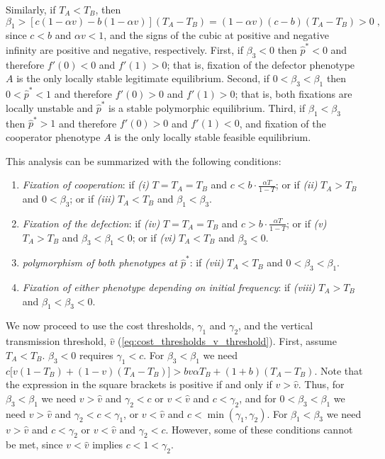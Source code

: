 \documentclass[12pt]{extarticle}
\begin{document}
\begin{appendices}
Similarly, if $T_A<T_B$, then
\begin{equation} \label{eq:beta1_rev}
   \beta_1 > [c(1-\alpha v) - b(1-\alpha v)] (T_A-T_B) 
   = (1-\alpha v)(c-b)(T_A-T_B) > 0 \;,
 \end{equation}
since $c<b$ and $\alpha v < 1$, and the signs of the cubic at positive and negative infinity are positive and negative, respectively. 
First, if $\beta_3<0$ then $\hat{p}^*<0$ and therefore $f'(0)<0$ and $f'(1)>0$; that is, fixation of the defector phenotype $A$ is the only locally stable legitimate equilibrium.
Second, if $0<\beta_3<\beta_1$ then $0<\hat{p}^*<1$ and therefore $f'(0)>0$ and $f'(1)>0$; that is, both fixations are locally unstable and $\hat{p}^*$ is a stable polymorphic equilibrium.
Third, if $\beta_1<\beta_3$ then $\hat{p}^*>1$ and therefore $f'(0)>0$ and $f'(1)<0$, and fixation of the cooperator phenotype $A$ is the only locally stable feasible equilibrium.

This analysis can be summarized with the following conditions:
\begin{enumerate}
\item \emph{Fixation of cooperation}: 
	if \emph{(i)} $T=T_A=T_B$ and $c < b\cdot \frac{\alpha T}{1-T}$; or
	if \emph{(ii)} $T_A>T_B$ and $0<\beta_3$; or 
	if \emph{(iii)} $T_A<T_B$ and $\beta_1<\beta_3$.
\item \emph{Fixation of the defection}: 
	if \emph{(iv)}  $T=T_A=T_B$ and $c > b\cdot \frac{\alpha T}{1-T}$; or 
	if \emph{(v)} $T_A>T_B$ and $\beta_3<\beta_1<0$; or 
	if \emph{(vi)} $T_A<T_B$ and $\beta_3<0$.
\item \emph{polymorphism of both phenotypes at $\hat{p}^*$}: 
	if \emph{(vii)} $T_A < T_B$ and $0<\beta_3<\beta_1$.
\item \emph{Fixation of either phenotype depending on initial frequency}:
	if \emph{(viii)}  $T_A>T_B$ and $\beta_1<\beta_3<0$.
\end{enumerate}

We now proceed to use the cost thresholds, $\gamma_1$ and $\gamma_2$, and the vertical transmission threshold, $\hat v$ (\autoref{eq:cost_thresholds_v_threshold}).
First, assume $T_A<T_B$.
$\beta_3<0$ requires $\gamma_1<c$.
For $\beta_3<\beta_1$ we need $c\big[v(1-T_B) + (1-v)(T_A-T_B)\big] > bv\alpha T_B + (1+b)(T_A-T_B)$.
Note that the expression in the square brackets is positive if and only if $v > \hat v$.
Thus, for $\beta_3<\beta_1$ we need $v > \hat v$ and $\gamma_2 < c$ or $v < \hat v$ and $c < \gamma_2$,
and for $0<\beta_3<\beta_1$ we need $v > \hat v$ and $\gamma_2 < c < \gamma_1$, or $v < \hat v$ and $c < \min(\gamma_1, \gamma_2)$. For $\beta_1<\beta_3$ we need $v > \hat v$ and $c<\gamma_2$ or $v < \hat v$ and $\gamma_2<c$.
However, some of these conditions cannot be met, since $v < \hat v$ implies $c<1<\gamma_2$.


\end{appendices}
\end{document}
